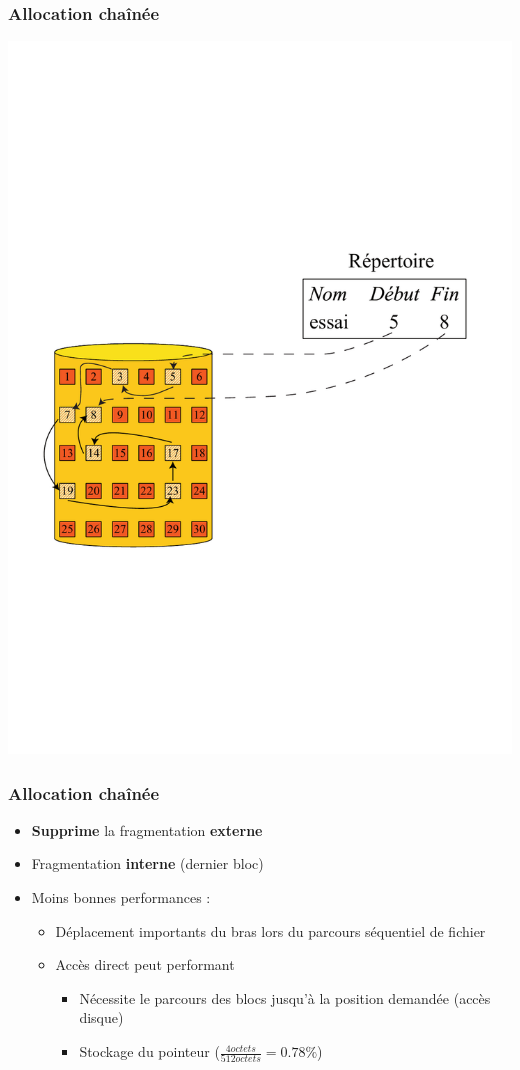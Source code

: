 \begin{frame}
\frametitle{Allocation chaînée}
\includegraphics[width=.8\textwidth]{../illustration/allocation_chainee.pdf}
\end{frame}

\begin{frame}
\frametitle{Allocation chaînée}
\begin{itemize}
\item \textbf{Supprime} la fragmentation \textbf{externe}
\item Fragmentation \textbf{interne} (dernier bloc)
\item Moins bonnes performances :
\begin{itemize}
\item Déplacement importants du bras lors du parcours séquentiel de fichier
\item Accès direct peut performant 
\begin{itemize}
\item Nécessite le parcours des blocs jusqu'à la position demandée (accès disque)
\item Stockage du pointeur ($\frac{4 octets}{512 octets} = 0.78\%$)
\end{itemize}
\end{itemize}
\end{itemize}
\end{frame}

